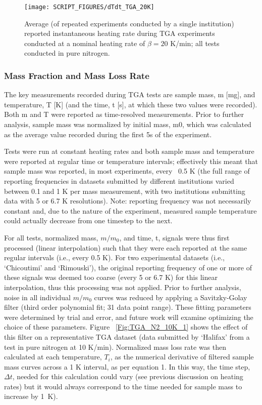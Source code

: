 \documentclass{book}
\begin{document}
\begin{figure}
  \centering
  \texttt{[image: SCRIPT\_FIGURES/dTdt\_TGA\_20K]}
  \caption{Average (of repeated experiments conducted by a single institution) reported instantaneous heating rate during TGA experiments conducted at a nominal heating rate of $\beta=20$ K/min; all tests conducted in pure nitrogen.}
  \label{Fig:dTdt_TGA_20K}
\end{figure}


\subsubsection{Mass Fraction and Mass Loss Rate}

The key measurements recorded during TGA tests are sample mass, m [mg], and temperature, T [K] (and the time, t [s], at which these two values were recorded).  Both m and T were reported as time-resolved measurements. Prior to further analysis, sample mass was normalized by initial mass, m0, which was calculated as the average value recorded during the first 5s of the experiment.

Tests were run at constant heating rates and both sample mass and temperature were reported at regular time or temperature intervals; effectively this meant that sample mass was reported, in most experiments, every ~0.5 K (the full range of reporting frequencies in datasets submitted by different institutions varied between 0.1 and 1 K per mass measurement, with two institutions submitting data with 5 or 6.7 K resolutions). Note: reporting frequency was not necessarily constant and, due to the nature of the experiment, measured sample temperature could actually decrease from one timestep to the next.

For all tests, normalized mass, $m/m_0$, and time, t, signals were thus first processed (linear interpolation) such that they were each reported at the same regular intervals (i.e., every 0.5 K). For two experimental datasets (i.e., ‘Chicoutimi’ and ‘Rimouski’), the original reporting frequency of one or more of these signals was deemed too coarse (every 5 or 6.7 K) for this linear interpolation, thus this processing was not applied.
Prior to further analysis, noise in all individual $m/m_0$ curves was reduced by applying a Savitzky-Golay filter (third order polynomial fit; 31 data point range). These fitting parameters were determined by trial and error, and future work will examine optimizing the choice of these parameters. Figure ~\ref{Fig:TGA_N2_10K_1} shows the effect of this filter on a representative TGA dataset (data submitted by ‘Halifax’ from a test in pure nitrogen at 10 K/min).
Normalized mass loss rate was then calculated at each temperature, $T_i$, as the numerical derivative of filtered sample mass curves across a 1 K interval, as per equation 1. In this way, the time step, $\Delta t$, needed for this calculation could vary (see previous discussion on heating rates) but it would always correspond to the time needed for sample mass to increase by 1~K).
\end{document}
